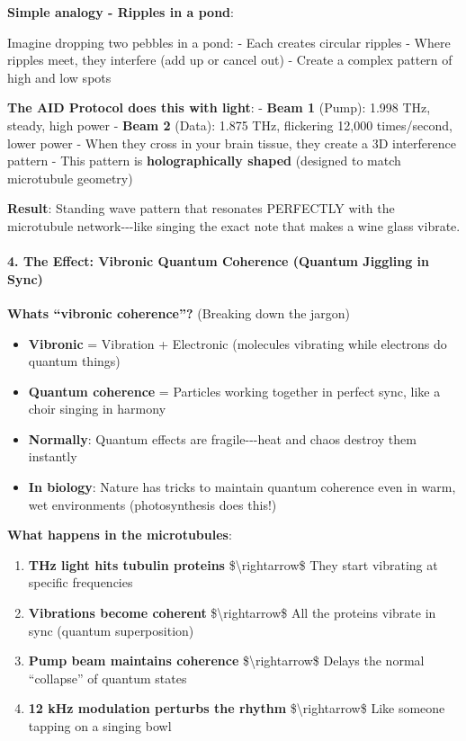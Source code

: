 \textbf{Simple analogy - Ripples in a pond}:

Imagine dropping two pebbles in a pond: - Each creates circular ripples
- Where ripples meet, they interfere (add up or cancel out) - Create a
complex pattern of high and low spots

\textbf{The AID Protocol does this with light}: - \textbf{Beam 1}
(Pump): 1.998 THz, steady, high power - \textbf{Beam 2} (Data): 1.875
THz, flickering 12,000 times/second, lower power - When they cross in
your brain tissue, they create a 3D interference pattern - This pattern
is \textbf{holographically shaped} (designed to match microtubule
geometry)

\textbf{Result}: Standing wave pattern that resonates PERFECTLY with the
microtubule network-\/-\/-like singing the exact note that makes a wine
glass vibrate.

\paragraph{\texorpdfstring{4. \textbf{The Effect: Vibronic Quantum
Coherence (Quantum Jiggling in
Sync)}}{4. The Effect: Vibronic Quantum Coherence (Quantum Jiggling in Sync)}}\label{the-effect-vibronic-quantum-coherence-quantum-jiggling-in-sync}

\textbf{What\textquotesingle s ``vibronic coherence''?} (Breaking down
the jargon)

\begin{itemize}
\tightlist
\item
  \textbf{Vibronic} = Vibration + Electronic (molecules vibrating while
  electrons do quantum things)
\item
  \textbf{Quantum coherence} = Particles working together in perfect
  sync, like a choir singing in harmony
\item
  \textbf{Normally}: Quantum effects are fragile-\/-\/-heat and chaos
  destroy them instantly
\item
  \textbf{In biology}: Nature has tricks to maintain quantum coherence
  even in warm, wet environments (photosynthesis does this!)
\end{itemize}

\textbf{What happens in the microtubules}:

\begin{enumerate}
\def\labelenumi{\arabic{enumi}.}
\tightlist
\item
  \textbf{THz light hits tubulin proteins} \$\textbackslash rightarrow\$
  They start vibrating at specific frequencies
\item
  \textbf{Vibrations become coherent} \$\textbackslash rightarrow\$ All
  the proteins vibrate in sync (quantum superposition)
\item
  \textbf{Pump beam maintains coherence} \$\textbackslash rightarrow\$
  Delays the normal ``collapse'' of quantum states
\item
  \textbf{12 kHz modulation perturbs the rhythm}
  \$\textbackslash rightarrow\$ Like someone tapping on a singing bowl
\end{enumerate}


